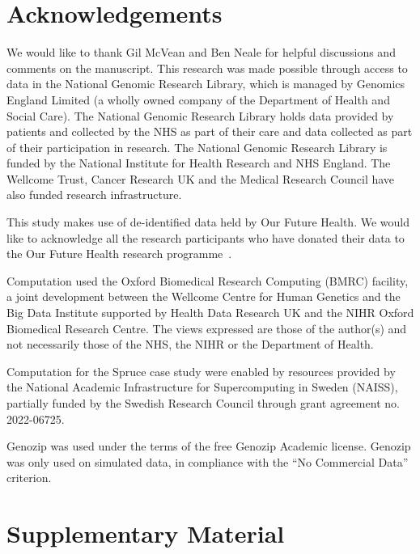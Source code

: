 \documentclass[a4paper,num-refs]{oup-contemporary}
\begin{document}
\section{Acknowledgements}
We would like to thank Gil McVean and Ben Neale for helpful discussions and
comments on the manuscript.
This research was made possible through access to data in the National Genomic
Research Library, which is managed by Genomics England Limited (a wholly owned
company of the Department of Health and Social Care). The National Genomic
Research Library holds data provided by patients and collected by the NHS as
part of their care and data collected as part of their participation in
research. The National Genomic Research Library is funded by the National
Institute for Health Research and NHS England. The Wellcome Trust, Cancer
Research UK and the Medical Research Council have also funded research
infrastructure.

This study makes use of de-identified data held by Our Future Health.
We would like to acknowledge all the research participants who have donated
their data to the Our Future Health research programme~\cite{ofhpubpolicy}.

Computation used the Oxford Biomedical Research Computing (BMRC) facility, a
joint development between the Wellcome Centre for Human Genetics and the Big
Data Institute supported by Health Data Research UK and the NIHR Oxford
Biomedical Research Centre. The views expressed are those of the author(s) and
not necessarily those of the NHS, the NIHR or the Department of Health.

Computation for the Spruce case study were enabled by resources
provided by the National Academic Infrastructure for Supercomputing in
Sweden (NAISS), partially funded by the Swedish Research Council
through grant agreement no. 2022-06725.

Genozip was used under the terms of the free Genozip Academic license.
Genozip was only used on simulated data, in compliance with
the ``No Commercial Data'' criterion.



\renewcommand\thefigure{S\arabic{figure}}
\setcounter{figure}{0}
\renewcommand\thetable{S\arabic{table}}
\setcounter{table}{0}

\section*{Supplementary Material}
\end{document}

